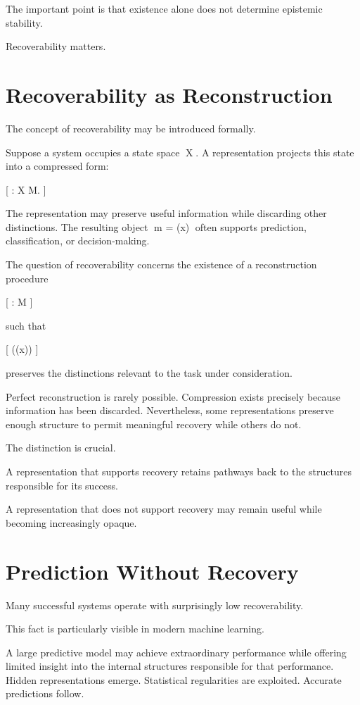 \documentclass[11pt,oneside,openany]{book}
\begin{document}
The important point is that existence alone does not determine epistemic stability.

Recoverability matters.

\section{Recoverability as Reconstruction}

The concept of recoverability may be introduced formally.

Suppose a system occupies a state space X. A representation projects this state into a compressed form:

[
\pi : X \rightarrow M.
]

The representation may preserve useful information while discarding other distinctions. The resulting object m = \pi(x) often supports prediction, classification, or decision-making.

The question of recoverability concerns the existence of a reconstruction procedure

[
\rho : M \rightarrow {}
]

such that

[
\rho(\pi(x))
]

preserves the distinctions relevant to the task under consideration.

Perfect reconstruction is rarely possible. Compression exists precisely because information has been discarded. Nevertheless, some representations preserve enough structure to permit meaningful recovery while others do not.

The distinction is crucial.

A representation that supports recovery retains pathways back to the structures responsible for its success.

A representation that does not support recovery may remain useful while becoming increasingly opaque.

\section{Prediction Without Recovery}

Many successful systems operate with surprisingly low recoverability.

This fact is particularly visible in modern machine learning.

A large predictive model may achieve extraordinary performance while offering limited insight into the internal structures responsible for that performance. Hidden representations emerge. Statistical regularities are exploited. Accurate predictions follow.
\end{document}
